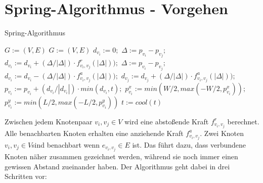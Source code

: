 \section{Spring-Algorithmus - Vorgehen}
\label{Kapitel_2_-_Unterkapitel_2}
%

\begin{algorithm}[t]
	\centering
	\caption[Ein Algorithmus]{Spring-Algorithmus} \label{algo_1}
	\begin{algorithmic}
		\REQUIRE \begin{math} G:= (V,E) \end{math}
		\ENSURE \begin{math} G:= (V,E) \end{math}
		\STATE $d_{v_{i}} := 0;$
		\STATE $\Delta := p_{v_{i}} - p_{v_{j}};$
		\STATE $d_{v_{i}} := d_{v_{i}} + (\Delta / |\Delta|) \cdot f^{r}_{v_{i},v_{j}}(|\Delta|));$
		\ENDIF
		\ENDFOR
		\ENDFOR
		\newline
		\STATE $\Delta := p_{v_{i}} - p_{v_{j}};$
		\STATE $d_{v_{i}} := d_{v_{i}} - (\Delta / |\Delta|) \cdot f^{a}_{v_{i},v_{j}}(|\Delta|));$
		\STATE $d_{v_{j}} := d_{v_{j}} + (\Delta / |\Delta|) \cdot f^{a}_{v_{i},v_{j}}(|\Delta|));$
		\ENDFOR
		\newline
		\STATE $p_{v_{i}} := p_{v_{i}} + ( d_{v_{i}}/ |d_{v_{i}}|) \cdot min ( d_{v_{i}}, t );$
		\STATE $p_{v_{i}}^{x} := min(W/2, max(-W/2, p_{v_{i}}^{x}));$
		\STATE $p_{v_{i}}^{y} := min(L/2, max(-L/2, p_{v_{i}}^{y}))$
		\ENDFOR
		\STATE $t:= cool(t)$
		\ENDFOR
	\end{algorithmic}
\end{algorithm}

Zwischen jedem Knotenpaar $v_{i},v_{j} \in V$ wird eine abstoßende Kraft \begin{math} f^{r}_{v_{i},v_{j}}  \end{math} berechnet.   Alle
benachbarten Knoten erhalten eine anziehende Kraft \begin{math} f^{a}_{v_{i},v_{j}} \end{math}. Zwei Knoten \begin{math} v_{i},v_{j} \in V \end{math}sind benachbart wenn \begin{math} e_{v_{i},v_{j}} \in E \end{math} ist. Das führt dazu, dass verbundene Knoten näher zusammen
gezeichnet werden, während sie noch immer einen gewissen Abstand zueinander
haben. Der Algorithmus geht dabei in drei Schritten vor:

